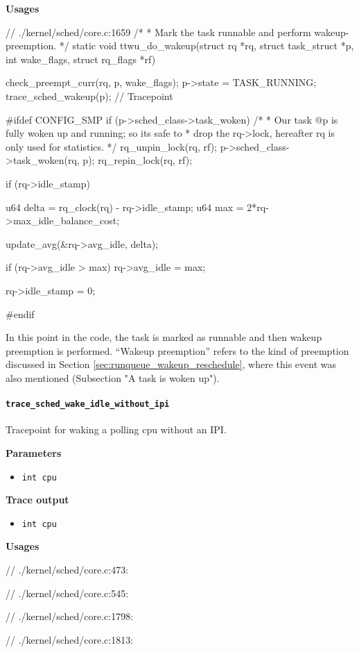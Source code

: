 \textbf{Usages}
\begin{code}
// ./kernel/sched/core.c:1659
/*
 * Mark the task runnable and perform wakeup-preemption.
 */
static void ttwu_do_wakeup(struct rq *rq, struct task_struct *p, int wake_flags,
			   struct rq_flags *rf){
	check_preempt_curr(rq, p, wake_flags);
	p->state = TASK_RUNNING;
	trace_sched_wakeup(p); // Tracepoint

#ifdef CONFIG_SMP
	if (p->sched_class->task_woken) {
		/*
		 * Our task @p is fully woken up and running; so its safe to
		 * drop the rq->lock, hereafter rq is only used for statistics.
		 */
		rq_unpin_lock(rq, rf);
		p->sched_class->task_woken(rq, p);
		rq_repin_lock(rq, rf);
	}

	if (rq->idle_stamp) {
		u64 delta = rq_clock(rq) - rq->idle_stamp;
		u64 max = 2*rq->max_idle_balance_cost;

		update_avg(&rq->avg_idle, delta);

		if (rq->avg_idle > max)
			rq->avg_idle = max;

		rq->idle_stamp = 0;
	}
#endif
}
\end{code}
In this point in the code, the task is marked as runnable and then wakeup preemption is performed. ``Wakeup preemption'' refers to the kind of preemption discussed in Section \ref{sec:runqueue_wakeup_reschedule}, where this event was also mentioned (Subsection "A task is woken up").
  
\paragraph{\texttt{trace\_sched\_wake\_idle\_without\_ipi}}
Tracepoint for waking a polling cpu without an IPI.

\textbf{Parameters}
\begin{itemize}
    \item \verb|int cpu|
\end{itemize}

\textbf{Trace output}
\begin{itemize}
    \item \verb|int cpu|
\end{itemize}

\textbf{Usages}
\begin{code}
// ./kernel/sched/core.c:473:
\end{code}
\begin{code}
// ./kernel/sched/core.c:545:
\end{code}
\begin{code}
// ./kernel/sched/core.c:1798: 
\end{code}
\begin{code}
// ./kernel/sched/core.c:1813:
\end{code}

